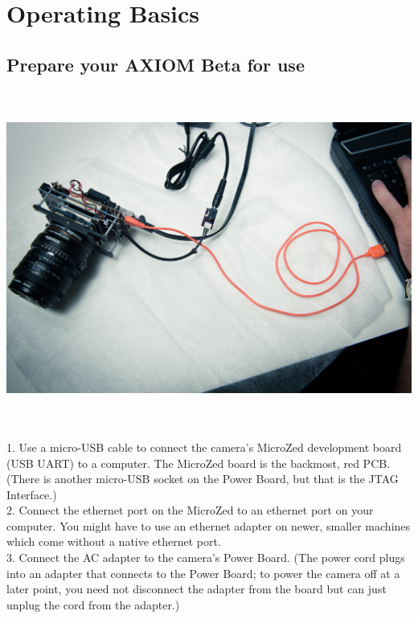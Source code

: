 \section{Operating Basics}

\subsection{Prepare your AXIOM Beta for use}

\begin{center}
\includegraphics[height=11cm]{images/Getting_Started}\\
\end{center}

1. Use a micro-USB cable to connect the camera's MicroZed development board (USB UART) to a computer. The MicroZed board is the backmost, red PCB. (There is another micro-USB socket on the Power Board, but that is the JTAG Interface.)\\

2. Connect the ethernet port on the MicroZed to an ethernet port on your computer. You might have to use an ethernet adapter on newer, smaller machines which come without a native ethernet port.\\ 

3. Connect the AC adapter to the camera's Power Board. (The power cord plugs into an adapter that connects to the Power Board; to power the camera off at a later point, you need not disconnect the adapter from the board but can just unplug the cord from the adapter.)



